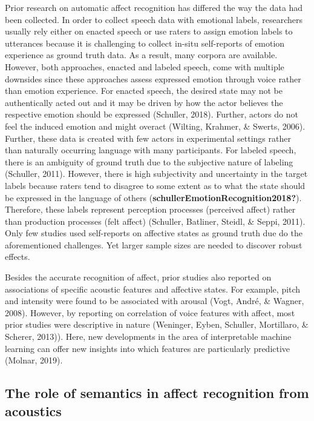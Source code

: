 \documentclass[
  english,
  man,floatsintext]{apa6}
\begin{document}
Prior research on automatic affect recognition has differed the way the data had been collected. In order to collect speech data with emotional labels, researchers usually rely either on enacted speech or use raters to assign emotion labels to utterances because it is challenging to collect in-situ self-reports of emotion experience as ground truth data. As a result, many corpora are available. However, both approaches, enacted and labeled speech, come with multiple downsides since these approaches assess expressed emotion through voice rather than emotion experience. For enacted speech, the desired state may not be authentically acted out and it may be driven by how the actor believes the respective emotion should be expressed (Schuller, 2018). Further, actors do not feel the induced emotion and might overact (Wilting, Krahmer, \& Swerts, 2006). Further, these data is created with few actors in experimental settings rather than naturally occurring language with many participants. For labeled speech, there is an ambiguity of ground truth due to the subjective nature of labeling (Schuller, 2011). However, there is high subjectivity and uncertainty in the target labels because raters tend to disagree to some extent as to what the state should be expressed in the language of others (\textbf{schullerEmotionRecognition2018?}). Therefore, these labels represent perception processes (perceived affect) rather than production processes (felt affect) (Schuller, Batliner, Steidl, \& Seppi, 2011). Only few studies used self-reports on affective states as ground truth due do the aforementioned challenges. Yet larger sample sizes are needed to discover robust effects.

Besides the accurate recognition of affect, prior studies also reported on associations of specific acoustic features and affective states. For example, pitch and intensity were found to be associated with arousal (Vogt, André, \& Wagner, 2008). However, by reporting on correlation of voice features with affect, most prior studies were descriptive in nature (Weninger, Eyben, Schuller, Mortillaro, \& Scherer, 2013)). Here, new developments in the area of interpretable machine learning can offer new insights into which features are particularly predictive (Molnar, 2019).

\hypertarget{the-role-of-semantics-in-affect-recognition-from-acoustics}{%
\subsection{The role of semantics in affect recognition from acoustics}\label{the-role-of-semantics-in-affect-recognition-from-acoustics}}
\end{document}
